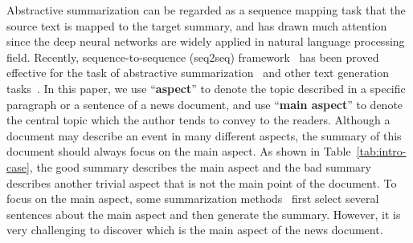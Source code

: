 \documentclass[letterpaper]{article} %
\newcommand{\mytodo}[1]{\textcolor{red}{\textbf{TODO: #1}}}
\newcommand{\zren}[1]{\textcolor{green}{\textbf{ZREN: #1}}}
\begin{document}
Abstractive summarization can be regarded as a sequence mapping task that the source text is mapped to the target summary, and has drawn much attention since the deep neural networks are widely applied in natural language processing field.
Recently, sequence-to-sequence (seq2seq) framework~\cite{Sutskever2014SequenceTS} has been proved effective for the task of abstractive summarization~\cite{Chopra2016AbstractiveSS,see2017get} and other text generation tasks~\cite{Tao2018GetTP,Gao2019Product}.
In this paper, we use ``\textbf{aspect}'' to denote the topic described in a specific paragraph or a sentence of a news document, and use ``\textbf{main aspect}'' to denote the central topic which the author tends to convey to the readers.
Although a document may describe an event in many different aspects, the summary of this document should always focus on the main aspect.
As shown in Table~\ref{tab:intro-case}, the good summary describes the main aspect and the bad summary describes another trivial aspect that is not the main point of the document.
To focus on the main aspect, some summarization methods~\cite{Sun2018AUM,Zhou2017SelectiveEF,Bansal2018FastAS} first select several sentences about the main aspect and then generate the summary.
However, it is very challenging to discover which is the main aspect of the news document.
\end{document}
